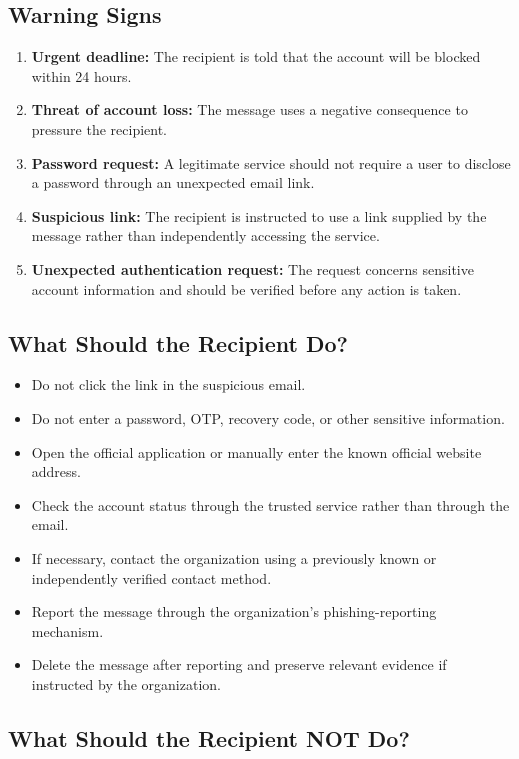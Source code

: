 \documentclass[12pt,a4paper]{article}
\begin{document}
\subsection{Warning Signs}

\begin{enumerate}
    \item \textbf{Urgent deadline:} The recipient is told that the account will be blocked within 24 hours.
    \item \textbf{Threat of account loss:} The message uses a negative consequence to pressure the recipient.
    \item \textbf{Password request:} A legitimate service should not require a user to disclose a password through an unexpected email link.
    \item \textbf{Suspicious link:} The recipient is instructed to use a link supplied by the message rather than independently accessing the service.
    \item \textbf{Unexpected authentication request:} The request concerns sensitive account information and should be verified before any action is taken.
\end{enumerate}

\subsection{What Should the Recipient Do?}

\begin{itemize}
    \item Do not click the link in the suspicious email.
    \item Do not enter a password, OTP, recovery code, or other sensitive information.
    \item Open the official application or manually enter the known official website address.
    \item Check the account status through the trusted service rather than through the email.
    \item If necessary, contact the organization using a previously known or independently verified contact method.
    \item Report the message through the organization's phishing-reporting mechanism.
    \item Delete the message after reporting and preserve relevant evidence if instructed by the organization.
\end{itemize}

\subsection{What Should the Recipient NOT Do?}
\end{document}
